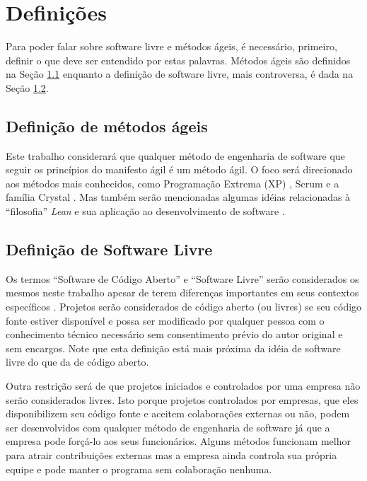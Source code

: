 \chapter{Definições}
\label{cap:definicoes}

Para poder falar sobre software livre e métodos ágeis, é necessário,
primeiro, definir o que deve ser entendido por estas palavras. Métodos
ágeis são definidos na Seção \ref{sec:agile-def} enquanto a definição
de software livre, mais controversa, é dada na Seção \ref{sec:os-def}.

\section{Definição de métodos ágeis}
\label{sec:agile-def}

Este trabalho considerará que qualquer método de engenharia de
software que seguir os princípios do manifesto ágil
\cite{AgileManifesto} é um método ágil. O foco será direcionado aos
métodos mais conhecidos, como Programação Extrema (XP) \cite{XP02},
Scrum \cite{Schwaber2004} e a família Crystal \cite{Cockburn2002}. Mas
também serão mencionadas algumas idéias relacionadas à ``filosofia''
\emph{Lean} \cite{Ohno1998} e sua aplicação ao desenvolvimento de
software \cite{Poppendieck2005}.

\section{Definição de Software Livre}
\label{sec:os-def}

Os termos ``Software de Código Aberto'' e ``Software Livre'' serão
considerados os mesmos neste trabalho apesar de terem diferenças
importantes em seus contextos específicos \cite[Ch. 1, Free Versus
Open source]{Fogel2005}. Projetos serão considerados de código aberto
(ou livres) se seu código fonte estiver disponível e possa ser
modificado por qualquer pessoa com o conhecimento técnico necessário
sem consentimento prévio do autor original e sem encargos. Note que
esta definição está mais próxima da idéia de software livre do que da
de código aberto.

Outra restrição será de que projetos iniciados e controlados por uma
empresa não serão considerados livres. Isto porque projetos
controlados por empresas, que eles disponibilizem seu código fonte e
aceitem colaborações externas ou não, podem ser desenvolvidos com
qualquer método de engenharia de software já que a empresa pode
forçá-lo aos seus funcionários. Alguns métodos funcionam melhor para
atrair contribuições externas mas a empresa ainda controla sua própria
equipe e pode manter o programa sem colaboração nenhuma.


